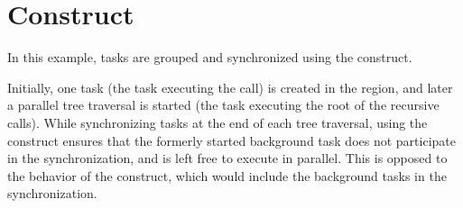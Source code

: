 \pagebreak
\section{ Construct}
\label{sec:taskgroup}

In this example, tasks are grouped and synchronized using the  
construct.

Initially, one task (the task executing the  
call) is created in the  region, and later a parallel tree traversal 
is started (the task executing the root of the recursive  
calls). While synchronizing tasks at the end of each tree traversal, using the 
 construct ensures that the formerly started background task 
does not participate in the synchronization, and is left free to execute in parallel. 
This is opposed to the behavior of the  construct, which would 
include the background tasks in the synchronization.



